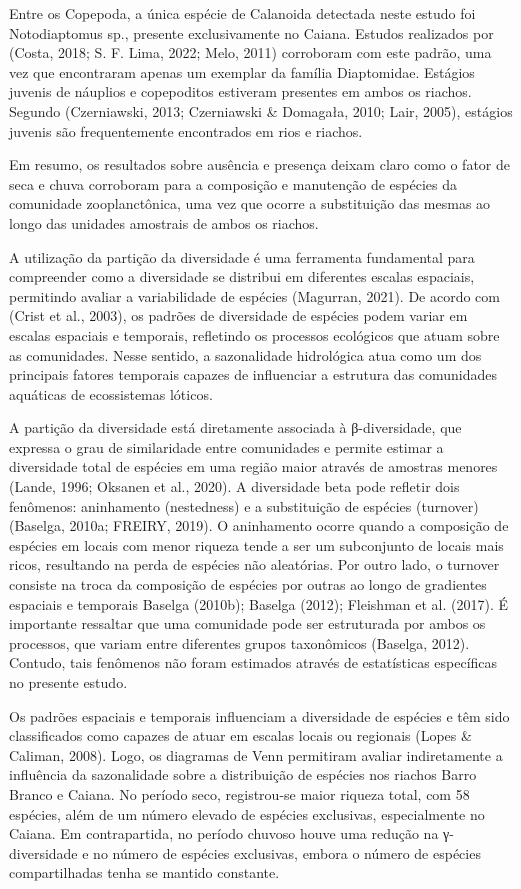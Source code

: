 \documentclass[
  letterpaper,
  DIV=11,
  numbers=noendperiod]{scrartcl}
\begin{document}
Entre os Copepoda, a única espécie de Calanoida detectada neste estudo
foi Notodiaptomus sp., presente exclusivamente no Caiana. Estudos
realizados por (Costa, 2018; S. F. Lima, 2022; Melo, 2011) corroboram
com este padrão, uma vez que encontraram apenas um exemplar da família
Diaptomidae. Estágios juvenis de náuplios e copepoditos estiveram
presentes em ambos os riachos. Segundo (Czerniawski, 2013; Czerniawski
\& Domagała, 2010; Lair, 2005), estágios juvenis são frequentemente
encontrados em rios e riachos.

Em resumo, os resultados sobre ausência e presença deixam claro como o
fator de seca e chuva corroboram para a composição e manutenção de
espécies da comunidade zooplanctônica, uma vez que ocorre a substituição
das mesmas ao longo das unidades amostrais de ambos os riachos.

A utilização da partição da diversidade é uma ferramenta fundamental
para compreender como a diversidade se distribui em diferentes escalas
espaciais, permitindo avaliar a variabilidade de espécies (Magurran,
2021). De acordo com (Crist et al., 2003), os padrões de diversidade de
espécies podem variar em escalas espaciais e temporais, refletindo os
processos ecológicos que atuam sobre as comunidades. Nesse sentido, a
sazonalidade hidrológica atua como um dos principais fatores temporais
capazes de influenciar a estrutura das comunidades aquáticas de
ecossistemas lóticos.

A partição da diversidade está diretamente associada à β-diversidade,
que expressa o grau de similaridade entre comunidades e permite estimar
a diversidade total de espécies em uma região maior através de amostras
menores (Lande, 1996; Oksanen et al., 2020). A diversidade beta pode
refletir dois fenômenos: aninhamento (nestedness) e a substituição de
espécies (turnover) (Baselga, 2010a; FREIRY, 2019). O aninhamento ocorre
quando a composição de espécies em locais com menor riqueza tende a ser
um subconjunto de locais mais ricos, resultando na perda de espécies não
aleatórias. Por outro lado, o turnover consiste na troca da composição
de espécies por outras ao longo de gradientes espaciais e temporais
Baselga (2010b); Baselga (2012); Fleishman et al. (2017). É importante
ressaltar que uma comunidade pode ser estruturada por ambos os
processos, que variam entre diferentes grupos taxonômicos (Baselga,
2012). Contudo, tais fenômenos não foram estimados através de
estatísticas específicas no presente estudo.

Os padrões espaciais e temporais influenciam a diversidade de espécies e
têm sido classificados como capazes de atuar em escalas locais ou
regionais (Lopes \& Caliman, 2008). Logo, os diagramas de Venn
permitiram avaliar indiretamente a influência da sazonalidade sobre a
distribuição de espécies nos riachos Barro Branco e Caiana. No período
seco, registrou-se maior riqueza total, com 58 espécies, além de um
número elevado de espécies exclusivas, especialmente no Caiana. Em
contrapartida, no período chuvoso houve uma redução na γ-diversidade e
no número de espécies exclusivas, embora o número de espécies
compartilhadas tenha se mantido constante.
\end{document}
